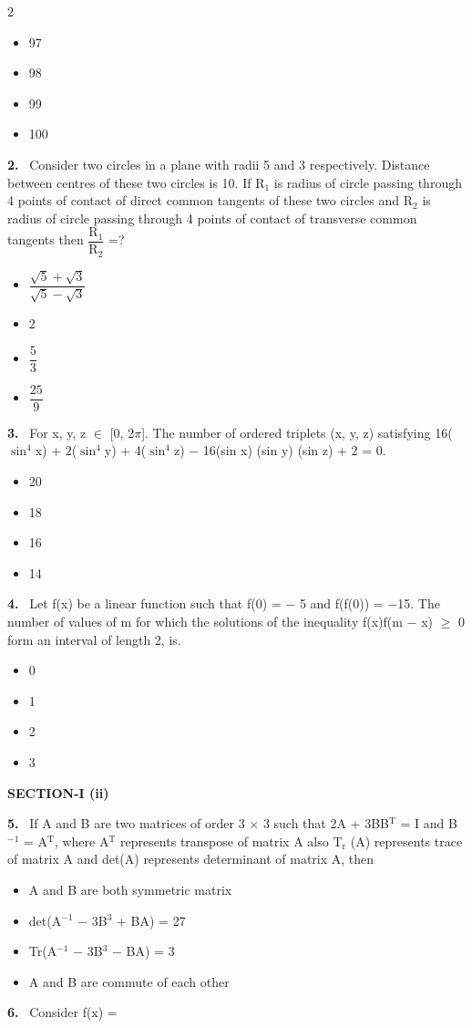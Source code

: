 \documentclass[10pt]{extarticle}
\newcommand{\sect}[1]{\par\smallskip\noindent\textbf{#1}\par}
\newcommand{\qn}[1]{\par\smallskip\noindent\textbf{#1.}~}
\newenvironment{qoptions}{\begin{itemize}[leftmargin=1.8em,itemsep=1pt,topsep=2pt,label={}]}{\end{itemize}}
\newcommand{\opt}[2]{\item[(#1)] #2}
\begin{document}
\begin{multicols}{2}
\begin{qoptions}
\opt{A}{97}
\opt{B}{98}
\opt{C}{99}
\opt{D}{100}
\end{qoptions}
\qn{2} Consider two circles in a plane with radii 5 and 3 respectively. Distance between centres of these two circles is 10. If R$_1$ is radius of circle passing through 4 points of contact of direct common tangents of these two circles and R$_2$ is radius of circle passing through 4 points of contact of transverse common tangents then $\dfrac{\text{R}_1}{\text{R}_2}$ =?
\begin{qoptions}
\opt{A}{$\dfrac{\sqrt{5}+\sqrt{3}}{\sqrt{5}-\sqrt{3}}$}
\opt{B}{2}
\opt{C}{$\dfrac{5}{3}$}
\opt{D}{$\dfrac{25}{9}$}
\end{qoptions}
\qn{3} For x, y, z $\in$ [0, 2$\pi$]. The number of ordered triplets (x, y, z) satisfying 16($\sin^4$x) + 2($\sin^4$y) + 4($\sin^4$z) $-$ 16(sin x) (sin y) (sin z) + 2 = 0.
\begin{qoptions}
\opt{A}{20}
\opt{B}{18}
\opt{C}{16}
\opt{D}{14}
\end{qoptions}
\qn{4} Let f(x) be a linear function such that f(0) = $-$ 5 and f(f(0)) = $-$15. The number of values of m for which the solutions of the inequality f(x)f(m $-$ x) $\geq$ 0 form an interval of length 2, is.
\begin{qoptions}
\opt{A}{0}
\opt{B}{1}
\opt{C}{2}
\opt{D}{3}
\end{qoptions}
\sect{SECTION-I (ii)}
\qn{5} If A and B are two matrices of order 3 $\times$ 3 such that 2A + 3BB$^\text{T}$ = I and B$^{-1}$ = A$^\text{T}$, where A$^\text{T}$ represents transpose of matrix A also T$_\text{r}$ (A) represents trace of matrix A and det(A) represents determinant of matrix A, then
\begin{qoptions}
\opt{A}{A and B are both symmetric matrix}
\opt{B}{det(A$^{-1}$ $-$ 3B$^3$ + BA) = 27}
\opt{C}{Tr(A$^{-1}$ $-$ 3B$^3$ $-$ BA) = 3}
\opt{D}{A and B are commute of each other}
\end{qoptions}
\qn{6} Consider f(x) = \par\noindent{}\par

\end{multicols}
\end{document}
